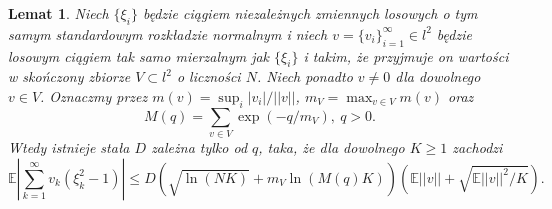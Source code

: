 \documentclass{article}
\newtheorem*{lem}{Lemat}
\begin{document}
\begin{lem}
Niech $\{\xi_i\}$ będzie ciągiem niezależnych zmiennych losowych o tym samym standardowym rozkładzie normalnym i niech $v=\{v_i\}_{i=1}^{\infty}\in l^2$ będzie losowym ciągiem tak samo mierzalnym jak $\{\xi_i\}$ i takim, że przyjmuje on wartości w skończony zbiorze $V\subset l^2$ o liczności $N$. Niech ponadto $v\neq 0$ dla dowolnego $v\in V$. Oznaczmy przez $m(v)=\sup_i |v_i|/||v||$, $m_V=\max_{v\in V}m(v)$ oraz 
\begin{displaymath}
M(q)=\sum_{v\in V}\exp (-q/m_V),\ q>0.
\end{displaymath}
Wtedy istnieje stała $D$ zależna tylko od $q$, taka, że dla dowolnego $K\geq 1$ zachodzi
\begin{displaymath}
\mathbb{E}\left|\sum_{k=1}^{\infty}v_k(\xi_k^2-1)\right|\leq D\left(\sqrt{\ln (NK)}+m_V\ln (M(q)K)\right)\left(\mathbb{E}||v||+\sqrt{\mathbb{E}||v||^2/K}\right).
\end{displaymath}
\end{lem}
\end{document}
